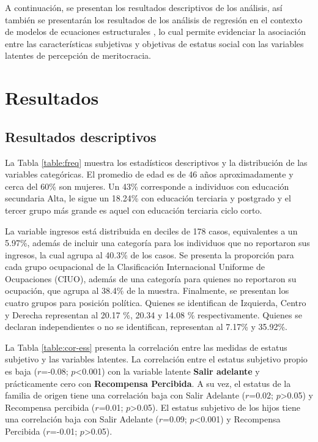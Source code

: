 \documentclass[12pt]{article}
\renewcommand{\baselinestretch}{1.5} %
\begin{document}
A continuación, se presentan los resultados descriptivos de los análisis, así también se presentarán los resultados de los análisis de regresión en el contexto de modelos de ecuaciones estructurales \cite{Brown2008}, lo cual permite evidenciar la asociación entre las características subjetivas y objetivas de estatus social con las variables latentes de percepción de meritocracia.

\newpage

\section{Resultados}

\subsection*{Resultados descriptivos}

La Tabla \ref{table:freq} muestra los estadísticos descriptivos y la distribución de las variables categóricas. El promedio de edad es de 46 años aproximadamente y cerca del 60\% son mujeres. Un 43\%  corresponde a individuos con educación secundaria Alta, le sigue un 18.24\% con educación terciaria y postgrado y el tercer grupo más grande es aquel con educación terciaria ciclo corto. 

\renewcommand{\arraystretch}{0.65}
\renewcommand{\baselinestretch}{1}


La variable ingresos está distribuida en deciles de 178 casos, equivalentes a un 5.97\%, además de incluir una categoría para los individuos que no reportaron sus ingresos, la cual agrupa al 40.3\% de los casos. Se presenta la proporción para cada grupo ocupacional de la Clasificación Internacional Uniforme de Ocupaciones (CIUO), además de una categoría  para quienes no reportaron su ocupación, que agrupa al 38.4\% de la muestra. Finalmente, se presentan los cuatro grupos para posición política. Quienes se identifican de Izquierda, Centro y Derecha representan al 20.17 \%, 20.34 y 14.08 \% respectivamente. Quienes se declaran independientes o no se identifican, representan al 7.17\% y 35.92\%. 

La Tabla \ref{table:cor-ess} presenta la correlación entre las medidas de estatus subjetivo y las variables latentes. La correlación entre el estatus subjetivo propio es baja ($r$=-0.08; $p$<0.001) con la variable latente \textbf{Salir adelante} y prácticamente cero con \textbf{Recompensa Percibida}. A su vez, el estatus de la familia de origen tiene una correlación baja con Salir Adelante ($r$=0.02; $p$>0.05) y Recompensa percibida ($r$=0.01; $p$>0.05). El estatus subjetivo de los hijos tiene una correlación baja con Salir Adelante ($r$=0.09; $p$<0.001) y Recompensa Percibida ($r$=-0.01; $p$>0.05). 
\end{document}
